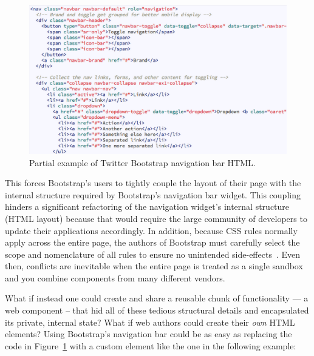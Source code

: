 \begin{figure}[htb]
\centering
 \includegraphics[width=\textwidth]{images/bootstrap_navbar_html.png}
\caption{Partial example of Twitter Bootstrap navigation bar HTML.}
\label{f:twbs1}
\end{figure}


This forces Bootstrap's users to tightly couple the layout of their page with the internal structure required by Bootstrap's navigation bar widget. 
This coupling hinders a significant refactoring of the navigation widget's internal structure (HTML layout) because that would require the large community of developers to update their applications accordingly.
In addition, because CSS rules normally apply across the entire page, the authors of Bootstrap must carefully select the scope and nomenclature of all rules to ensure no unintended side-effects~\cite{walton2014}. 
Even then, conflicts are inevitable when the entire page is treated as a single sandbox and you combine components from many different vendors. 

What if instead one could create and share a reusable chunk of functionality --- a web component -- that hid all of these tedious structural details and encapsulated its private, internal state? 
What if web authors could create their \textit{own} HTML elements?  
Using Bootstrap's navigation bar could be as easy as replacing the code in Figure~\ref{f:twbs1} with a custom element like the one in the following example:

% 

